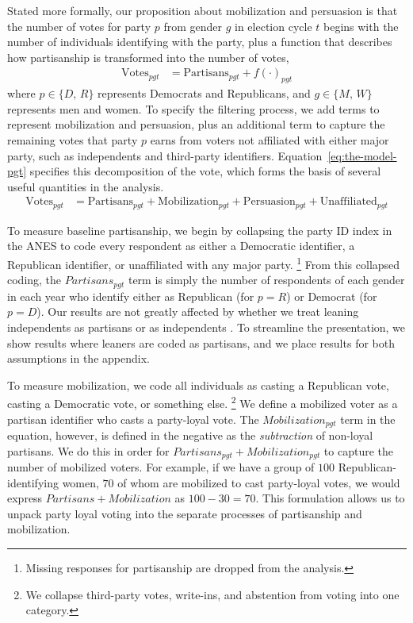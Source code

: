 \documentclass[12pt
               ,final
               ]{article}
\begin{document}
Stated more formally, our proposition about mobilization and persuasion is that the number of votes for party $p$ from gender $g$ in election cycle $t$ begins with the number of individuals identifying with the party, plus a function that describes how partisanship is transformed into the number of votes,
% 
  \begin{align}
    \mathrm{Votes}_{pgt}  &=  \mathrm{Partisans}_{pgt} + f(\cdot)_{pgt}
  \end{align}
% 
where $p \in \{D, \, R\}$ represents Democrats and Republicans, and $g \in \{M, \, W\}$ represents men and women. To specify the filtering process, we add terms to represent mobilization and persuasion, plus an additional term to capture the remaining votes that party $p$ earns from voters not affiliated with either major party, such as independents and third-party identifiers. Equation~\ref{eq:the-model-pgt} specifies this decomposition of the vote, which forms the basis of several useful quantities in the analysis.
 \begin{align}
  \label{eq:the-model-pgt}
  \mathrm{Votes}_{pgt} &= 
   \mathrm{Partisans}_{pgt} + \mathrm{Mobilization}_{pgt} + \mathrm{Persuasion}_{pgt} + \mathrm{Unaffiliated}_{pgt}
 \end{align}

To measure baseline partisanship, we begin by collapsing the party ID index in the ANES to code every respondent as either a Democratic identifier, a Republican identifier, or unaffiliated with any major party.%
  \footnote{Missing responses for partisanship are dropped from the analysis.}
From this collapsed coding, the $\mathit{Partisans}_{pgt}$ term is simply the number of respondents of each gender in each year who identify either as Republican (for $p = R$) or Democrat (for $p = D$). Our results are not greatly affected by whether we treat leaning independents as partisans or as independents \citep{keith1992myth,miller1996new,petrocik_measuring_2009,klar2016independent}. To streamline the presentation, we show results where leaners are coded as partisans, and we place results for both assumptions in the appendix.

To measure mobilization, we code all individuals as casting a Republican vote, casting a Democratic vote, or something else.%
  \footnote{We collapse third-party votes, write-ins, and abstention from voting into one category.}
%
We define a mobilized voter as a partisan identifier who casts a party-loyal vote. The $\mathit{Mobilization}_{pgt}$ term in the equation, however, is defined in the negative as the \emph{subtraction} of non-loyal partisans. We do this in order for $\mathit{Partisans}_{pgt} + \mathit{Mobilization}_{pgt}$ to capture the number of mobilized voters. For example, if we have a group of $100$ Republican-identifying women, $70$ of whom are mobilized to cast party-loyal votes, we would express $\mathit{Partisans} + \mathit{Mobilization}$ as $100 - 30 = 70$. This formulation allows us to unpack party loyal voting into the separate processes of partisanship and mobilization.
\end{document}
